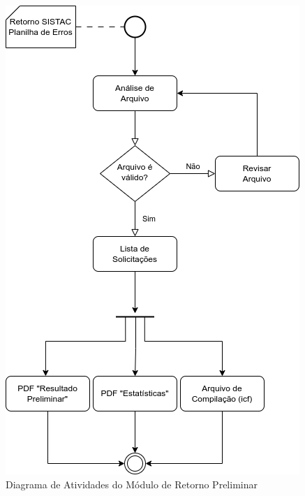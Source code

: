 \documentclass[
	12pt,			%
	openright,		%
	oneside,	
	a4paper,		%
	english,		%
	brazil			%
]{abntex2/abntex2}  %
\begin{document}
		\clearpage
		\begin{figure}[!ht]
			\begin{center}
				
				\caption{Diagrama de Atividades do Módulo de Retorno Preliminar}
				\includegraphics[scale=0.85]{img/diagrama-ativs-prelim}
				
			\end{center}
		\end{figure}
		
\end{document}
